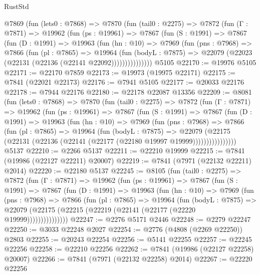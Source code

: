 \begin{lexlean}{RustStd}
\begin{coremodule}
    @7869
      (fun (lets0 : @7868) =>
      @7870
        (fun (tail0 : @2275) =>
        @7872
          (fun (Γ : @7871) =>
          @19962
            (fun (ps : @19961) =>
            @7867
              (fun (S : @1991) =>
              @7867
                (fun (D : @1991) =>
                @19963
                  (fun (hn : @10) =>
                  @7969
                    (fun (pns : @7968) =>
                    @7866
                      (fun (pl : @7865) =>
                      @19964
                        (fun (bodyL : @7875) =>
                        @22079 (@22023 (@22131 (@22136 (@22141 @22092)))))))))))))))
    @5105
@22170 := @19976 @5105
@22171 := @22170 @7859
@22173 := @19973 (@19975 @22171)
@22175 := @7841 (@22021 @22173)
@22176 := @7941 @5105
@22177 := @20033 @22176
@22178 := @7944 @22176
@22180 := @22178 @22087 @13356
@22209 := @8081
    (fun (lets0 : @7868) =>
    @7870
      (fun (tail0 : @2275) =>
      @7872
        (fun (Γ : @7871) =>
        @19962
          (fun (ps : @19961) =>
          @7867
            (fun (S : @1991) =>
            @7867
              (fun (D : @1991) =>
              @19963
                (fun (hn : @10) =>
                @7969
                  (fun (pns : @7968) =>
                  @7866
                    (fun (pl : @7865) =>
                    @19964
                      (fun (bodyL : @7875) =>
                      @22079
                        (@22175
                          (@22131 (@22136 (@22141 (@22177 (@22180 @19997 @19999))))))))))))))))
    @5137
@22210 := @2266 @5137
@22211 := @22210 @19999
@22215 := @7841 (@19986 (@22127 @22211) @20007)
@22219 := @7841 (@7971 (@22132 @22211) @2014)
@22220 := @22180 @5137
@22245 := @8105
    (fun (tail0 : @2275) =>
    @7872
      (fun (Γ : @7871) =>
      @19962
        (fun (ps : @19961) =>
        @7867
          (fun (S : @1991) =>
          @7867
            (fun (D : @1991) =>
            @19963
              (fun (hn : @10) =>
              @7969
                (fun (pns : @7968) =>
                @7866
                  (fun (pl : @7865) =>
                  @19964
                    (fun (bodyL : @7875) =>
                    @22079 (@22175 (@22215 (@22219 (@22141 (@22177 (@22220 @19999)))))))))))))))
@22247 := @2276 @5171 @2446
@22248 := @2279 @22247
@22250 := @3033 @22248 @2027
@22254 := @2776 (@4808 (@2269 @22250)) @2803
@22255 := @20243 @22254
@22256 := @5141 @22255
@22257 := @22245 @22256
@22258 := @22210 @22256
@22262 := @7841 (@19986 (@22127 @22258) @20007)
@22266 := @7841 (@7971 (@22132 @22258) @2014)
@22267 := @22220 @22256

\end{coremodule}
\end{lexlean}
